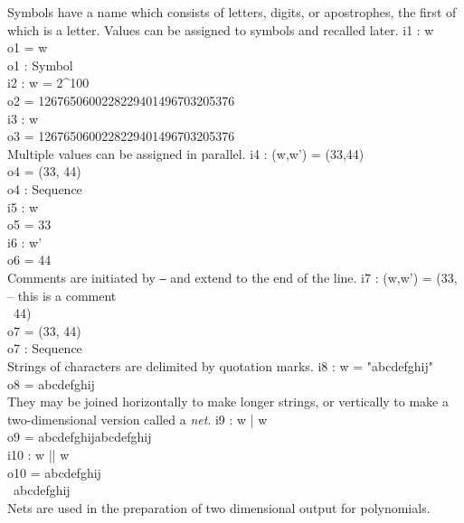Symbols have a name which consists of letters, digits, or apostrophes, the
first of which is a letter.  Values can be assigned to symbols and recalled
later.
\beginOutput
i1 : w\\
\emptyLine
o1 = w\\
\emptyLine
o1 : Symbol\\
\endOutput
\beginOutput
i2 : w = 2^100\\
\emptyLine
o2 = 1267650600228229401496703205376\\
\endOutput
\beginOutput
i3 : w\\
\emptyLine
o3 = 1267650600228229401496703205376\\
\endOutput
Multiple values can be assigned in parallel.
\beginOutput
i4 : (w,w') = (33,44)\\
\emptyLine
o4 = (33, 44)\\
\emptyLine
o4 : Sequence\\
\endOutput
\beginOutput
i5 : w\\
\emptyLine
o5 = 33\\
\endOutput
\beginOutput
i6 : w'\\
\emptyLine
o6 = 44\\
\endOutput
Comments are initiated by {\tt --} and extend to the end of the line.
\beginOutput
i7 : (w,w') = (33,   -- this is a comment\\
\               44)\\
\emptyLine
o7 = (33, 44)\\
\emptyLine
o7 : Sequence\\
\endOutput
Strings of characters are delimited by quotation marks.
\beginOutput
i8 : w = "abcdefghij"\\
\emptyLine
o8 = abcdefghij\\
\endOutput
They may be joined horizontally to make longer strings, or vertically to make
a two-dimensional version called a {\sl net}.
\beginOutput
i9 : w | w\\
\emptyLine
o9 = abcdefghijabcdefghij\\
\endOutput
\beginOutput
i10 : w || w\\
\emptyLine
o10 = abcdefghij\\
\      abcdefghij\\
\endOutput
Nets are used in the preparation of two dimensional output for polynomials.

